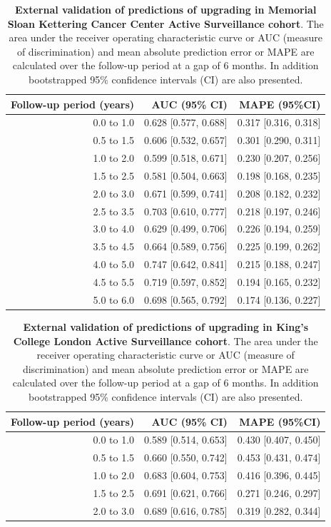 \begin{table}[!htb]
\small\sf\centering
\caption{\textbf{External validation of predictions of upgrading in Memorial Sloan Kettering Cancer Center Active Surveillance cohort}. The area under the receiver operating characteristic curve or AUC (measure of discrimination) and mean absolute prediction error or MAPE are calculated over the follow-up period at a gap of 6 months. In addition bootstrapped 95\% confidence intervals (CI) are also presented.}
\label{tab:AUC_PE_MSKCC}
\begin{tabular}{r|r|r}
\hline
\hline
Follow-up period (years) & AUC (95\% CI) & MAPE (95\%CI)\\ 
\hline
0.0 to 1.0 & 0.628 [0.577, 0.688]  & 0.317 [0.316, 0.318]\\
0.5 to 1.5 & 0.606 [0.532, 0.657]  & 0.301 [0.290, 0.311]\\
1.0 to 2.0 & 0.599 [0.518, 0.671]  & 0.230 [0.207, 0.256]\\
1.5 to 2.5 & 0.581 [0.504, 0.663]  & 0.198 [0.168, 0.235]\\
2.0 to 3.0 & 0.671 [0.599, 0.741]  & 0.208 [0.182, 0.232]\\
2.5 to 3.5 & 0.703 [0.610, 0.777]  & 0.218 [0.197, 0.246]\\
3.0 to 4.0 & 0.629 [0.499, 0.706]  & 0.226 [0.194, 0.259]\\
3.5 to 4.5 & 0.664 [0.589, 0.756]  & 0.225 [0.199, 0.262]\\
4.0 to 5.0 & 0.747 [0.642, 0.841]  & 0.215 [0.188, 0.247]\\
4.5 to 5.5 & 0.719 [0.597, 0.852]  & 0.194 [0.165, 0.232]\\
5.0 to 6.0 & 0.698 [0.565, 0.792]  & 0.174 [0.136, 0.227]\\
\hline
\end{tabular}    
\end{table}

\begin{table}[!htb]
\small\sf\centering
\caption{\textbf{External validation of predictions of upgrading in King's College London Active Surveillance cohort}. The area under the receiver operating characteristic curve or AUC (measure of discrimination) and mean absolute prediction error or MAPE are calculated over the follow-up period at a gap of 6 months. In addition bootstrapped 95\% confidence intervals (CI) are also presented.}
\label{tab:AUC_PE_KCL}
\begin{tabular}{r|r|r}
\hline
\hline
Follow-up period (years) & AUC (95\% CI) & MAPE (95\%CI)\\ 
\hline
0.0 to 1.0 & 0.589 [0.514, 0.653] & 0.430 [0.407, 0.450] \\
0.5 to 1.5 & 0.660 [0.550, 0.742] & 0.453 [0.431, 0.474] \\
1.0 to 2.0 & 0.683 [0.604, 0.753] & 0.416 [0.396, 0.445] \\
1.5 to 2.5 & 0.691 [0.621, 0.766] & 0.271 [0.246, 0.297] \\
2.0 to 3.0 & 0.689 [0.616, 0.785] & 0.319 [0.282, 0.344] \\
\hline
\end{tabular}    
\end{table}

